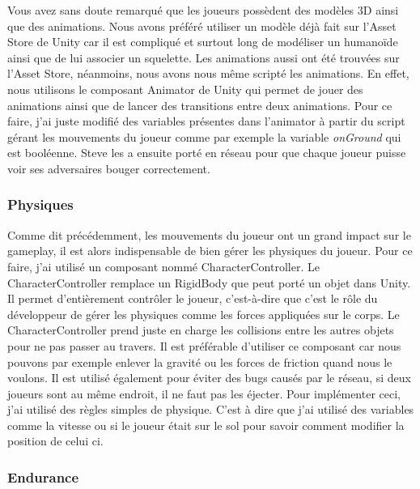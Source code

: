\documentclass{article}
\begin{document}
Vous avez sans doute remarqué que les joueurs possèdent des modèles 3D ainsi que des animations.
Nous avons préféré utiliser un modèle déjà fait sur l'Asset Store de Unity car il est compliqué et surtout long de modéliser un humanoïde ainsi que de lui associer un squelette. Les animations aussi ont été trouvées sur l'Asset Store, néanmoins, nous avons nous même scripté les animations. En effet, nous utilisons le composant Animator de Unity qui permet de jouer des animations ainsi que de lancer des transitions entre deux animations. Pour ce faire, j'ai juste modifié des variables présentes dans l'animator à partir du script gérant les mouvements du joueur comme par exemple la variable \emph{onGround} qui est booléenne. Steve les a ensuite porté en réseau pour que chaque joueur puisse voir ses adversaires bouger correctement.

\subsubsection{Physiques}

Comme dit précédemment, les mouvements du joueur ont un grand impact sur le gameplay, il est alors indispensable de bien gérer les physiques du joueur.
Pour ce faire, j'ai utilisé un composant nommé CharacterController. Le CharacterController remplace un RigidBody que peut porté un objet dans Unity. Il permet d'entièrement contrôler le joueur, c'est-à-dire que c'est le rôle du développeur de gérer les physiques comme les forces appliquées sur le corps. Le CharacterController prend juste en charge les collisions entre les autres objets pour ne pas passer au travers. Il est préférable d'utiliser ce composant car nous pouvons par exemple enlever la gravité ou les forces de friction quand nous le voulons. Il est utilisé également pour éviter des bugs causés par le réseau, si deux joueurs sont au même endroit, il ne faut pas les éjecter.
Pour implémenter ceci, j'ai utilisé des règles simples de physique. C'est à dire que j'ai utilisé des variables comme la vitesse ou si le joueur était sur le sol pour savoir comment modifier la position de celui ci.

\subsubsection{Endurance}
\end{document}
